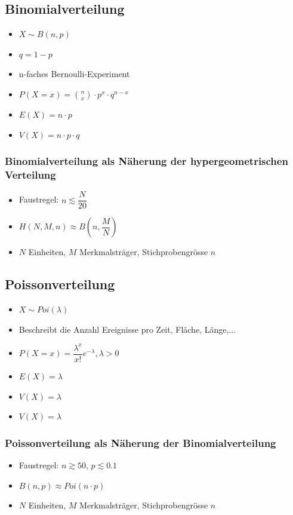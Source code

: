 \documentclass[8pt,a4paper]{scrartcl}
\begin{document}
\begin{multicols*}{3}
			\subsection{Binomialverteilung}
				\begin{itemize}\itemsep0pt				
					\item $X \sim B(n,p)$
					\item $q = 1-p$
					\item n-faches Bernoulli-Experiment
					\item $P(X=x)={n\choose x} \cdot p^{x} \cdot q^{n-x} $
					\item $E(X)=n\cdot p$
					\item $V(X)=n\cdot p\cdot q$
				\end{itemize}	
				
				\subsubsection{Binomialverteilung als Näherung der hypergeometrischen Verteilung}
					\begin{itemize}\itemsep0pt				
						\item Faustregel: $n \lesssim \dfrac{N}{20}$
						\item $H(N,M,n) \approx B(n,\dfrac{M}{N})$
						\item $N$ Einheiten, $M$ Merkmalsträger, Stichprobengrösse $n$
					\end{itemize}	
			
			\subsection{Poissonverteilung}
				\begin{itemize}\itemsep0pt				
					\item $X \sim Poi(\lambda)$
					\item Beschreibt die Anzahl Ereignisse pro Zeit, Fläche, Länge,...
					\item $P(X=x)= \dfrac{\lambda^{x}}{x!}e^{-\lambda}, \lambda > 0$
					\item $E(X)= \lambda$
					\item $V(X)= \lambda$
					\item $V(X)= \lambda$
				\end{itemize}	
				
				\subsubsection{Poissonverteilung als Näherung der Binomialverteilung}
					\begin{itemize}\itemsep0pt				
						\item Faustregel: $n \gtrsim 50$, $p \lesssim 0.1$
						\item $B(n,p) \approx Poi(n\cdot p)$
						\item $N$ Einheiten, $M$ Merkmalsträger, Stichprobengrösse $n$
					\end{itemize}	
			

\end{multicols*}
\end{document}
